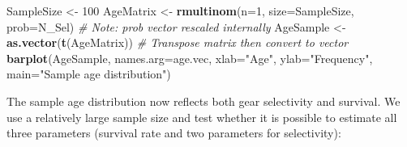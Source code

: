 \documentclass[
]{krantz}
\makeatletter
\newenvironment{Shaded}{\begin{snugshade}}{\end{snugshade}}
\newcommand{\AttributeTok}[1]{\textcolor[rgb]{0.27,0.27,0.27}{#1}}
\newcommand{\CommentTok}[1]{\textcolor[rgb]{0.37,0.37,0.37}{\textit{#1}}}
\newcommand{\DecValTok}[1]{\textcolor[rgb]{0.06,0.06,0.06}{#1}}
\newcommand{\FunctionTok}[1]{\textcolor[rgb]{0.27,0.27,0.27}{\textbf{#1}}}
\newcommand{\NormalTok}[1]{#1}
\newcommand{\OtherTok}[1]{\textcolor[rgb]{0.37,0.37,0.37}{#1}}
\newcommand{\StringTok}[1]{\textcolor[rgb]{0.5,0.5,0.5}{#1}}
\newenvironment{kframe}{%
\medskip{}
\setlength{\fboxsep}{.8em}
 \def\at@end@of@kframe{}%
 \ifinner\ifhmode%
  \def\at@end@of@kframe{\end{minipage}}%
  \begin{minipage}{\columnwidth}%
 \fi\fi%
 \def\FrameCommand##1{\hskip\@totalleftmargin \hskip-\fboxsep
 \colorbox{shadecolor}{##1}\hskip-\fboxsep
     \hskip-\linewidth \hskip-\@totalleftmargin \hskip\columnwidth}%
 \MakeFramed {\advance\hsize-\width
   \@totalleftmargin\z@ \linewidth\hsize
   \@setminipage}}%
 {\par\unskip\endMakeFramed%
 \at@end@of@kframe}
\renewenvironment{Shaded}{\begin{kframe}}{\end{kframe}}
\makeatother
\begin{document}
\begin{Shaded}
\begin{Highlighting}[]
\NormalTok{SampleSize }\OtherTok{\textless{}{-}} \DecValTok{100}
\NormalTok{AgeMatrix }\OtherTok{\textless{}{-}} \FunctionTok{rmultinom}\NormalTok{(}\AttributeTok{n=}\DecValTok{1}\NormalTok{, }\AttributeTok{size=}\NormalTok{SampleSize, }\AttributeTok{prob=}\NormalTok{N\_Sel)}
  \CommentTok{\# Note: prob vector rescaled internally}
\NormalTok{AgeSample }\OtherTok{\textless{}{-}} \FunctionTok{as.vector}\NormalTok{(}\FunctionTok{t}\NormalTok{(AgeMatrix)) }
  \CommentTok{\# Transpose matrix then convert to vector}
\FunctionTok{barplot}\NormalTok{(AgeSample, }\AttributeTok{names.arg=}\NormalTok{age.vec, }\AttributeTok{xlab=}\StringTok{"Age"}\NormalTok{, }
        \AttributeTok{ylab=}\StringTok{"Frequency"}\NormalTok{, }\AttributeTok{main=}\StringTok{"Sample age distribution"}\NormalTok{)}
\end{Highlighting}
\end{Shaded}

The sample age distribution now reflects both gear selectivity and survival. We use a relatively large sample size and test whether it is possible to estimate all three parameters (survival rate and two parameters for selectivity):
\end{document}

